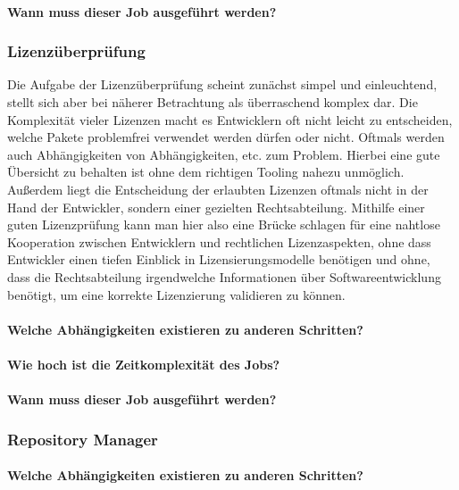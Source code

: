 \paragraph{Wann muss dieser Job ausgeführt werden?}

\subsubsection{Lizenzüberprüfung}

Die Aufgabe der Lizenzüberprüfung scheint zunächst simpel und einleuchtend, stellt sich aber bei näherer Betrachtung als überraschend komplex dar.
Die Komplexität vieler Lizenzen macht es Entwicklern oft nicht leicht zu entscheiden, welche Pakete problemfrei verwendet werden dürfen oder nicht.
Oftmals werden auch Abhängigkeiten von Abhängigkeiten, etc. zum Problem.
Hierbei eine gute Übersicht zu behalten ist ohne dem richtigen Tooling nahezu unmöglich.
Außerdem liegt die Entscheidung der erlaubten Lizenzen oftmals nicht in der Hand der Entwickler, sondern einer gezielten Rechtsabteilung.
Mithilfe einer guten Lizenzprüfung kann man hier also eine Brücke schlagen für eine nahtlose Kooperation zwischen Entwicklern und rechtlichen Lizenzaspekten, ohne dass Entwickler einen tiefen Einblick in Lizensierungsmodelle benötigen und ohne, dass die Rechtsabteilung irgendwelche Informationen über Softwareentwicklung benötigt, um eine korrekte Lizenzierung validieren zu können.

\paragraph{Welche Abhängigkeiten existieren zu anderen Schritten?}
\paragraph{Wie hoch ist die Zeitkomplexität des Jobs?}
\paragraph{Wann muss dieser Job ausgeführt werden?}

\subsubsection{Repository Manager}
\paragraph{Welche Abhängigkeiten existieren zu anderen Schritten?}
